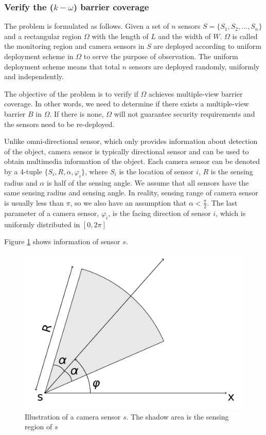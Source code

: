 \subsubsection{Verify the ($k-\omega$) barrier coverage}
The problem is formulated as follows. Given a set of $n$ sensors $S=\{S_1,S_2,...,S_n\}$ and a rectangular region $\Omega$ with the length of $L$ and the width of $W$. $\Omega$ is called the monitoring region and camera sensors in $S$ are deployed according to uniform deployment scheme in $\Omega$ to serve the purpose of observation. The uniform deployment scheme means that total $ n $ sensors are deployed randomly, uniformly and independently.\par

The objective of the problem is to verify if $\Omega$ achieves multiple-view barrier coverage. In other words, we need to determine if there exists a multiple-view barrier $B$ in $\Omega$. If there is none, $\Omega$ will not guarantee security requirements and the sensors need to be re-deployed.\par

Unlike omni-directional sensor, which only provides information about detection of the object, camera sensor is typically directional sensor and can be used to obtain multimedia information of the object. Each camera sensor can be denoted by a 4-tuple $\{S_i, R, \alpha, \varphi_i\}$, where $S_i$ is the location of sensor $i$, $R$ is the sensing radius and $\alpha$ is half of the sensing angle. We assume that all sensors have the same sensing radius and sensing angle. In reality, sensing range of camera sensor is usually less than $\pi$, so we also have an assumption that $\alpha < \displaystyle\frac{\pi}{2}$. The last parameter of a camera sensor, $\varphi_i$, is the facing direction of sensor $i$, which is uniformly distributed in $[0,2\pi]$ \par
Figure \ref{sensing-model} shows information of sensor $s$.
\begin{figure}[!h]
	\centering
	\includegraphics[scale=.5]{Hinhanh/sensing-model2}
	\caption{Illustration of a camera sensor $s$. The shadow area is the sensing region of $s$}
	\label{sensing-model}
\end{figure}

